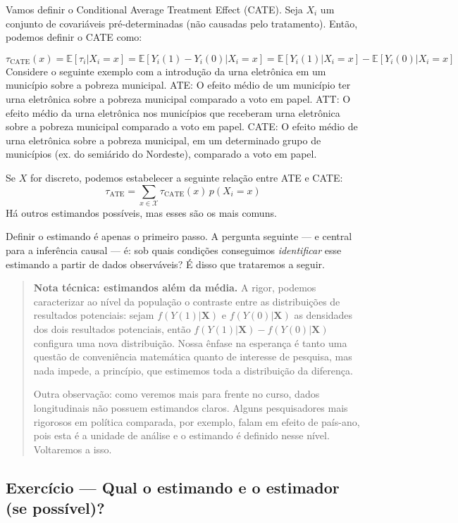 \documentclass[
]{article}
\begin{document}
Vamos definir o Conditional Average Treatment Effect (CATE). Seja \(X_i\) um conjunto de covariáveis pré-determinadas (não causadas pelo tratamento). Então, podemos definir o CATE como:

\[\tau_{\text{CATE}}(x) = \mathbb{E}[\tau_i|X_i=x] = \mathbb{E}[Y_i(1) - Y_i(0)|X_i=x] = \mathbb{E}[Y_i(1)|X_i=x] - \mathbb{E}[Y_i(0)|X_i=x]\]
Considere o seguinte exemplo com a introdução da urna eletrônica em um município sobre a pobreza municipal.
ATE: O efeito médio de um município ter urna eletrônica sobre a pobreza municipal comparado a voto em papel.
ATT: O efeito médio da urna eletrônica nos municípios que receberam urna eletrônica sobre a pobreza municipal comparado a voto em papel.
CATE: O efeito médio de urna eletrônica sobre a pobreza municipal, em um determinado grupo de municípios (ex. do semiárido do Nordeste), comparado a voto em papel.

Se \(X\) for discreto, podemos estabelecer a seguinte relação entre ATE e CATE:
\[\tau_{\text{ATE}} = \sum_{x \in \mathcal{X}} \tau_{\text{CATE}}(x) \, p(X_i = x)\]
Há outros estimandos possíveis, mas esses são os mais comuns.

Definir o estimando é apenas o primeiro passo. A pergunta seguinte --- e central para a inferência causal --- é: sob quais condições conseguimos \emph{identificar} esse estimando a partir de dados observáveis? É disso que trataremos a seguir.

\begin{quote}
\textbf{Nota técnica: estimandos além da média.} A rigor, podemos caracterizar ao nível da população o contraste entre as distribuições de resultados potenciais: sejam \(f(Y(1)|\mathbf{X})\) e \(f(Y(0)|\mathbf{X})\) as densidades dos dois resultados potenciais, então \(f(Y(1)|\mathbf{X}) - f(Y(0)|\mathbf{X})\) configura uma nova distribuição. Nossa ênfase na esperança é tanto uma questão de conveniência matemática quanto de interesse de pesquisa, mas nada impede, a princípio, que estimemos toda a distribuição da diferença.

Outra observação: como veremos mais para frente no curso, dados longitudinais não possuem estimandos claros. Alguns pesquisadores mais rigorosos em política comparada, por exemplo, falam em efeito de país-ano, pois esta é a unidade de análise e o estimando é definido nesse nível. Voltaremos a isso.
\end{quote}

\subsection{Exercício --- Qual o estimando e o estimador (se possível)?}\label{exercuxedcio-qual-o-estimando-e-o-estimador-se-possuxedvel}
\end{document}
